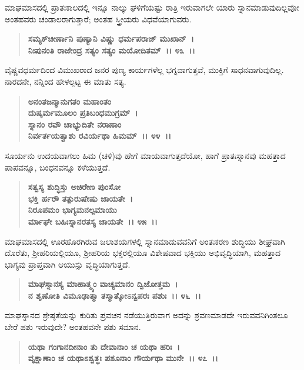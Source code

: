 ಮಾಘಮಾಸದಲ್ಲಿ ಪ್ರಾತಃಕಾಲದಲ್ಲಿ ಇನ್ನೂ ನಾಲ್ಕು ಘಳಿಗೆಯಷ್ಟು ರಾತ್ರಿ ಇರುವಾಗಲೇ ಯಾರು ಸ್ನಾನಮಾಡುವುದಿಲ್ಲವೋ ಅಂತಹವರು ಚಂಡಾಲರಾಗುತ್ತಾರೆ; ಅಂತಹ ಸ್ತ್ರೀಯರು ವಿಧವೆಯಾಗುವರು.

\begin{verse}
\textbf{ಸಮ್ಯಕ್‌ಚೀರ್ಣಾನಿ ಪುಣ್ಯಾನಿ ವಿಷ್ಣು ಧರ್ಮಪರಾಜ್ ಮುಖಾನ್~।}\\\textbf{ನಿಃಪುನಂತಿ ರಾಜೇಂದ್ರ ಸತ್ಯಂ ಸತ್ಯಂ ಮಯೋದಿತಮ್~।। ೪೩~।।}
\end{verse}

ವೈಷ್ಣವಧರ್ಮದಿಂದ ವಿಮುಖರಾದ ಜನರ ಪುಣ್ಯ ಕಾರ್ಯಗಳೆಲ್ಲ ಭಗ್ನವಾಗುತ್ತವೆ, ಮುಕ್ತಿಗೆ ಸಾಧನವಾಗುವುದಿಲ್ಲ. ನಾರದನೇ, ನನ್ನಿಂದ ಹೇಳಲ್ಪಟ್ಟ ಈ ಮಾತು ಸತ್ಯ.

\begin{verse}
\textbf{ಅನಂತಜನ್ಮಾನುಗತಂ ಮಹಾಂತಂ}\\\textbf{ದುಷ್ಕರ್ಮಮೂಲಂ ಪ್ರತಿಬಂಧಮುಗ್ರಮ್~।}\\\textbf{ಸ್ನಾನಂ ರವೌ ಚಾಭ್ಯುದಿತೇ ನರಾಣಾಂ }\\\textbf{ನಿರ್ವರ್ತಯತ್ವಾಶು ರವಿರ್ಯಥಾ ಹಿಮಮ್~।। ೪೪~।।}
\end{verse}

ಸೂರ್ಯನು ಉದಯವಾಗಲು ಹಿಮ (ಚಳಿ)ವು ಹೇಗೆ ಮಾಯವಾಗುತ್ತದೆಯೋ, ಹಾಗೆ ಪ್ರಾತಃಸ್ನಾನವು ಮಹತ್ತಾದ ಪಾಪವನ್ನೂ, ಬಂಧನವನ್ನೂ ಕಳೆಯುತ್ತದೆ.

\begin{verse}
\textbf{ಸತ್ವಸ್ಯ ಶುದ್ಧಿಸ್ತು ಅಚಿರೇಣ ಪುಂಸೋ}\\\textbf{ಭಕ್ತಿ ರ್ಹರೌ ತತ್ಪುರುಷೇಷು ಜಾಯತೇ~।}\\\textbf{ನಿರೂಪಮಂ ಭಾಗ್ಯಮನಲ್ಪಮಾಯು}\\\textbf{ರ್ಮಾಘೇ ಬಹಿಃಸ್ನಾನರತಸ್ಯ ಜಾಯತೇ~।। ೪೫~।।}
\end{verse}

ಮಾಘಮಾಸದಲ್ಲಿ ಊರಹೊರಗಿರುವ ಜಲಾಶಯಗಳಲ್ಲಿ ಸ್ನಾನಮಾಡುವವನಿಗೆ ಅಂತಃ\-ಕರಣ ಶುದ್ಧಿಯು ಶೀಘ್ರವಾಗಿ ದೊರೆತು, ಶ‍್ರೀಹರಿಯಲ್ಲಿಯೂ, ಶ‍್ರೀಹರಿಯ ಭಕ್ತರಲ್ಲಿಯೂ ವಿಶೇಷವಾದ ಭಕ್ತಿಯು ಅಭಿವೃದ್ಧಿಯಾಗಿ, ಮಹತ್ತಾದ ಭಾಗ್ಯವು ಪ್ರಾಪ್ತವಾಗಿ ಆಯುಸ್ಸು ವೃದ್ಧಿಯಾಗುತ್ತದೆ.

\begin{verse}
\textbf{ಮಾಘಸ್ನಾನಸ್ಯ ಮಾಹಾತ್ಮ್ಯಂ ವಾಚ್ಯಮಾನಂ ದ್ವಿಜೋತ್ತಮ~।}\\\textbf{ನ ಶೃಣೋತಿ ವಿಮೂಢಾತ್ಮಾ ತಸ್ಮಾತ್ಕೋಽನ್ವಪರಃ ಪಶುಃ~।। ೪೬~।।}
\end{verse}

ಮಾಘಸ್ನಾನದ ಶ್ರೇಷ್ಠತೆಯನ್ನು ಕುರಿತು ಪ್ರವಚನ ನಡೆಯುತ್ತಿರುವಾಗ ಅದನ್ನು ಶ್ರವಣಮಾಡದೇ ಇರುವವನಿಗಿಂತಲೂ ಬೇರೆ ಪಶು ಇರುವುದೇ? ಅಂತಹವನೇ ಪಶು ಸಮಾನ.

\begin{verse}
\textbf{ಯಥಾ ಗಂಗಾನದೀನಾಂ ತು ದೇವಾನಾಂ ಚ ಯಥಾ ಹರಿಃ~।}\\\textbf{ವೃಕ್ಷಾಣಾಂ ಚ ಯಥಾಽಶ್ವತ್ಥಃ ಪಶೂನಾಂ ಗೌರ್ಯಥಾ ಮುನೇ~।। ೪೭~।। }
\end{verse}

